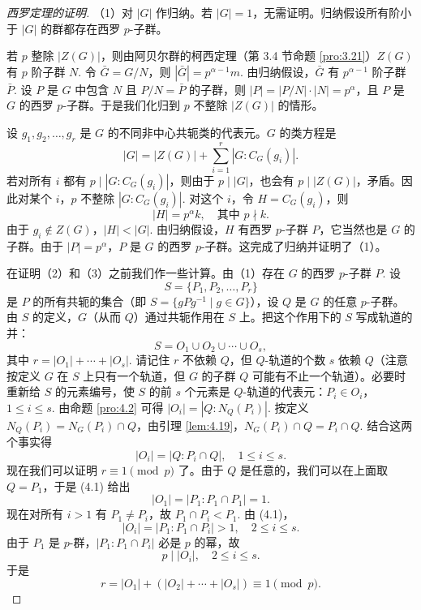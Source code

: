 \begin{proof}[西罗定理的证明]
（1）对 \(|G|\) 作归纳。若 \(|G| = 1\)，无需证明。归纳假设所有阶小于 \(|G|\) 的群都存在西罗 \(p\)-子群。

若 \(p\) 整除 \(|Z(G)|\)，则由阿贝尔群的柯西定理（第 3.4 节命题 \ref{pro:3.21}）\(Z(G)\) 有 \(p\) 阶子群 \(N\). 令 \(\bar{G} = G/N\)，则 \(|\bar{G}| = p^{\alpha-1}m\). 由归纳假设，\(\bar{G}\) 有 \(p^{\alpha-1}\) 阶子群 \(\bar{P}\). 设 \(P\) 是 \(G\) 中包含 \(N\) 且 \(P/N = \bar{P}\) 的子群，则 \(|P| = |P/N| \cdot |N| = p^\alpha\)，且 \(P\) 是 \(G\) 的西罗 \(p\)-子群。于是我们化归到 \(p\) 不整除 \(|Z(G)|\) 的情形。

设 \(g_1, g_2, \ldots, g_r\) 是 \(G\) 的不同非中心共轭类的代表元。\(G\) 的类方程是
\[
|G| = |Z(G)| + \sum_{i=1}^{r} |G : C_G(g_i)|.
\]
若对所有 \(i\) 都有 \(p \mid |G : C_G(g_i)|\)，则由于 \(p \mid |G|\)，也会有 \(p \mid |Z(G)|\)，矛盾。因此对某个 \(i\)，\(p\) 不整除 \(|G : C_G(g_i)|\). 对这个 \(i\)，令 \(H = C_G(g_i)\)，则
\[
|H| = p^\alpha k, \quad \text{其中 } p \nmid k.
\]
由于 \(g_i \notin Z(G)\)，\(|H| < |G|\). 由归纳假设，\(H\) 有西罗 \(p\)-子群 \(P\)，它当然也是 \(G\) 的子群。由于 \(|P| = p^\alpha\)，\(P\) 是 \(G\) 的西罗 \(p\)-子群。这完成了归纳并证明了（1）。

在证明（2）和（3）之前我们作一些计算。由（1）存在 \(G\) 的西罗 \(p\)-子群 \(P\). 设
\[
S = \{P_1, P_2, \ldots, P_r\}
\]
是 \(P\) 的所有共轭的集合（即 \(S = \{gPg^{-1} \mid g \in G\}\)），设 \(Q\) 是 \(G\) 的任意 \(p\)-子群。由 \(S\) 的定义，\(G\)（从而 \(Q\)）通过共轭作用在 \(S\) 上。把这个作用下的 \(S\) 写成轨道的并：
\[
S = O_1 \cup O_2 \cup \cdots \cup O_s,
\]
其中 \(r = |O_1| + \cdots + |O_s|\). 请记住 \(r\) 不依赖 \(Q\)，但 \(Q\)-轨道的个数 \(s\) 依赖 \(Q\)（注意按定义 \(G\) 在 \(S\) 上只有一个轨道，但 \(G\) 的子群 \(Q\) 可能有不止一个轨道）。必要时重新给 \(S\) 的元素编号，使 \(S\) 的前 \(s\) 个元素是 \(Q\)-轨道的代表元：\(P_i \in O_i\)，\(1 \leq i \leq s\). 由命题 \ref{pro:4.2} 可得 \(|O_i| = |Q : N_Q(P_i)|\). 按定义 \(N_Q(P_i) = N_G(P_i) \cap Q\)，由引理 \ref{lem:4.19}，\(N_G(P_i) \cap Q = P_i \cap Q\). 结合这两个事实得
\[
|O_i| = |Q : P_i \cap Q|, \quad 1 \leq i \leq s. \tag{4.1}
\]
现在我们可以证明 \(r \equiv 1 \pmod{p}\) 了。由于 \(Q\) 是任意的，我们可以在上面取 \(Q = P_1\)，于是 (4.1) 给出
\[
|O_1| = |P_1 : P_1 \cap P_1| = 1.
\]
现在对所有 \(i > 1\) 有 \(P_1 \neq P_i\)，故 \(P_1 \cap P_i < P_1\). 由 (4.1)，
\[
|O_i| = |P_1 : P_1 \cap P_i| > 1, \quad 2 \leq i \leq s.
\]
由于 \(P_1\) 是 \(p\)-群，\(|P_1 : P_1 \cap P_i|\) 必是 \(p\) 的幂，故
\[
p \mid |O_i|, \quad 2 \leq i \leq s.
\]
于是
\[
r = |O_1| + (|O_2| + \cdots + |O_s|) \equiv 1 \pmod{p}.
\]


\end{proof}
